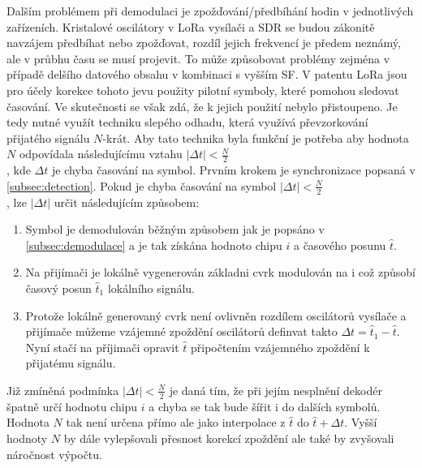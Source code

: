 \documentclass{ctuthesis}
\begin{document}
Dalším problémem při demodulaci je zpožďování/předbíhání hodin v jednotlivých zařízeních. Kristalové oscilátory v LoRa vysílači a SDR se budou zákonitě navzájem předbíhat nebo zpožďovat, rozdíl jejich frekvencí je předem neznámý, ale v průbhu času se musí projevit. To může způsobovat problémy zejména v případě delšího datového obsahu v kombinaci s vyšším SF. V patentu LoRa jsou pro účely korekce tohoto jevu použity pilotní symboly, které pomohou sledovat časování. Ve skutečnosti se však zdá, že k jejich použití nebylo přistoupeno. Je tedy nutné využít techniku slepého odhadu, která využívá převzorkování přijatého signálu $N$-krát. Aby tato technika byla funkční je potřeba aby hodnota $N$ odpovídala následujícímu vztahu $\lvert\Delta t \rvert < \frac{N}{2}$\\, kde $\Delta t$ je chyba časování na symbol.
Prvním krokem je synchronizace popsaná v \ref{subsec:detection}. Pokud je chyba časování na symbol  $\lvert\Delta t \rvert < \frac{N}{2}$\\, lze $\lvert\Delta t \rvert$ určit následujícím způsobem:
\begin{enumerate}
\item
Symbol je demodulován běžným způsobem jak je popsáno v \ref{subsec:demodulace} a je tak získána hodnoto chipu $i$  a časového posunu $\hat{t}$.
\item
Na přijímači je lokálně vygenerován základni cvrk modulován na i což způsobí časový posun $\hat{t}_1$ lokálního signálu.
\item
Protože lokálně generovaný cvrk není ovlivněn rozdílem oscilátorů vysílače a přijímače můžeme vzájemné zpoždění oscilátorů definvat takto $\Delta t = \hat{t}_1 - \hat{t}$. Nyní stačí na příjimači opravit $\hat{t}$ připočtením vzájemného zpoždění k přijatému signálu.
\end{enumerate}
Již zmíněná podmínka $\lvert\Delta t \rvert < \frac{N}{2}$ je daná tím, že při jejím nesplnění dekodér špatně určí hodnotu chipu $i$ a chyba se tak bude šířit i do dalších symbolů. Hodnota $N$ tak není určena přímo ale jako interpolace z $\hat{t}$ do $\hat{t} + \Delta t$. Vyšší hodnoty $N$ by dále vylepšovali přesnost korekcí zpoždění ale také by zvyšovali náročnost výpočtu.
\end{document}
